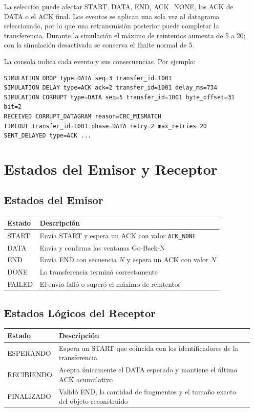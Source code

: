 \documentclass[12pt]{article}
\begin{document}
La selección puede afectar START, DATA, END, ACK\_NONE, los ACK de DATA o el
ACK final. Los eventos se aplican una sola vez al datagrama seleccionado, por
lo que una retransmisión posterior puede completar la transferencia. Durante
la simulación el máximo de reintentos aumenta de 5 a 20; con la simulación
desactivada se conserva el límite normal de 5.

La consola indica cada evento y sus consecuencias. Por ejemplo:

\begin{verbatim}
SIMULATION DROP type=DATA seq=3 transfer_id=1001
SIMULATION DELAY type=ACK ack=2 transfer_id=1001 delay_ms=734
SIMULATION CORRUPT type=DATA seq=5 transfer_id=1001 byte_offset=31 bit=2
RECEIVED CORRUPT_DATAGRAM reason=CRC_MISMATCH
TIMEOUT transfer_id=1001 phase=DATA retry=2 max_retries=20
SENT_DELAYED type=ACK ...
\end{verbatim}

\section{Estados del Emisor y Receptor}

\subsection{Estados del Emisor}

\begin{table}[h]
\centering
\begin{tabular}{|l|p{9cm}|}
\hline
Estado & Descripción \\
\hline
START & Envía START y espera un ACK con valor \texttt{ACK\_NONE} \\
\hline
DATA & Envía y confirma las ventanas Go-Back-N \\
\hline
END & Envía END con secuencia $N$ y espera un ACK con valor $N$ \\
\hline
DONE & La transferencia terminó correctamente \\
\hline
FAILED & El envío falló o superó el máximo de reintentos \\
\hline
\end{tabular}
\end{table}

\subsection{Estados Lógicos del Receptor}

\begin{table}[h]
\centering
\begin{tabular}{|l|p{9cm}|}
\hline
Estado & Descripción \\
\hline
ESPERANDO & Espera un START que coincida con los identificadores de la transferencia \\
\hline
RECIBIENDO & Acepta únicamente el DATA esperado y mantiene el último ACK acumulativo \\
\hline
FINALIZADO & Validó END, la cantidad de fragmentos y el tamaño exacto del objeto reconstruido \\
\hline
\end{tabular}
\end{table}
\end{document}
